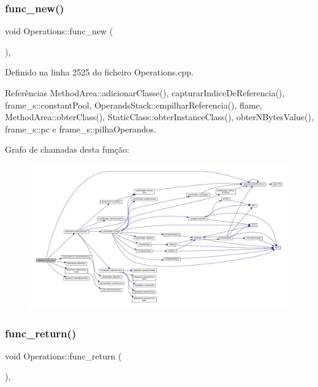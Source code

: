 \subsubsection{\texorpdfstring{func\+\_\+new()}{func\_new()}}
{\footnotesize\ttfamily void Operations\+::func\+\_\+new (\begin{DoxyParamCaption}{ }\end{DoxyParamCaption})\hspace{0.3cm}{\ttfamily [static]}, {\ttfamily [private]}}



Definido na linha 2525 do ficheiro Operations.\+cpp.



Referências Method\+Area\+::adicionar\+Classe(), capturar\+Indice\+De\+Referencia(), frame\+\_\+s\+::constant\+Pool, Operands\+Stack\+::empilhar\+Referencia(), flame, Method\+Area\+::obter\+Class(), Static\+Class\+::obter\+Instance\+Class(), obter\+N\+Bytes\+Value(), frame\+\_\+s\+::pc e frame\+\_\+s\+::pilha\+Operandos.

Grafo de chamadas desta função\+:
\nopagebreak
\begin{figure}[H]
\begin{center}
\leavevmode
\includegraphics[width=350pt]{classOperations_a7594e147407e1f4ede57229899fd17d6_cgraph}
\end{center}
\end{figure}
\mbox{\label{classOperations_aa33b77fb62f7e76c347503c97c6b080b}} 
\subsubsection{\texorpdfstring{func\+\_\+return()}{func\_return()}}
{\footnotesize\ttfamily void Operations\+::func\+\_\+return (\begin{DoxyParamCaption}{ }\end{DoxyParamCaption})\hspace{0.3cm}{\ttfamily [static]}, {\ttfamily [private]}}



